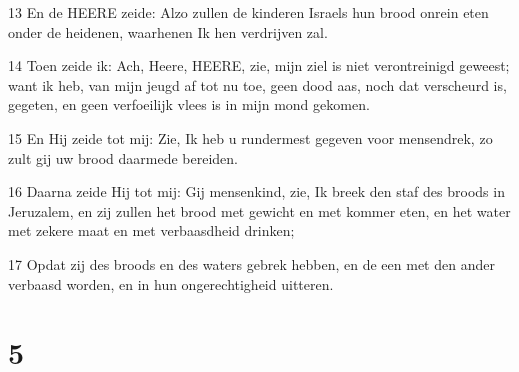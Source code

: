 \par 13 En de HEERE zeide: Alzo zullen de kinderen Israels hun brood onrein eten onder de heidenen, waarhenen Ik hen verdrijven zal.
\par 14 Toen zeide ik: Ach, Heere, HEERE, zie, mijn ziel is niet verontreinigd geweest; want ik heb, van mijn jeugd af tot nu toe, geen dood aas, noch dat verscheurd is, gegeten, en geen verfoeilijk vlees is in mijn mond gekomen.
\par 15 En Hij zeide tot mij: Zie, Ik heb u rundermest gegeven voor mensendrek, zo zult gij uw brood daarmede bereiden.
\par 16 Daarna zeide Hij tot mij: Gij mensenkind, zie, Ik breek den staf des broods in Jeruzalem, en zij zullen het brood met gewicht en met kommer eten, en het water met zekere maat en met verbaasdheid drinken;
\par 17 Opdat zij des broods en des waters gebrek hebben, en de een met den ander verbaasd worden, en in hun ongerechtigheid uitteren.

\chapter{5}

